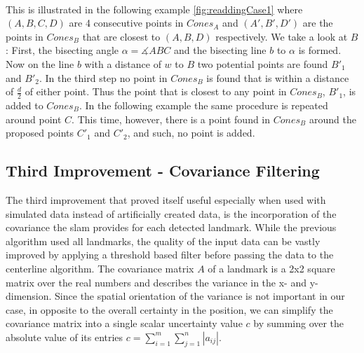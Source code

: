 \\This is illustrated in the following example \ref{fig:readdingCase1} where $(A,B,C,D)$ are 4 consecutive points in $Cones_A$ and $(A',B',D')$ are the points in $Cones_B$ that are closest to $(A,B,D)$ respectively.
We take a look at $B$: First, the bisecting angle $\alpha =\measuredangle  ABC$ and the bisecting line $b$ to $\alpha$ is formed. Now on the line $b$ with a distance of $w$ to $B$ two potential points are found $B'_1$ and $B'_2$. In the third step no point in $Cones_B$ is found that is within a distance of $\frac{d}{2}$ of either point. Thus the point that is closest to any point in $Cones_B$, $B'_1$, is added to $Cones_B$.
In the following example the same procedure is repeated around point $C$.
 This time, however, there is a point found in $Cones_B$ around the proposed points $C'_1$ and $C'_2$, and such, no point is added.
\subsection{Third Improvement - Covariance Filtering}
The third improvement that proved itself useful especially when used with simulated data instead of artificially created data, is the incorporation of the covariance the \ac{slam} provides for each detected landmark. While the previous algorithm used all landmarks, the quality of the input data can be vastly improved by applying a threshold based filter before passing the data to the centerline algorithm. The covariance matrix $A$ of a landmark is a 2x2 square matrix over the real numbers and describes the variance in the x- and y-dimension. Since the spatial orientation of the variance is not important in our case, in opposite to the overall certainty in the position, we can simplify the covariance matrix into a single scalar uncertainty value $c$ by summing over the absolute value of its entries $c = \sum_{i=1}^m \sum_{j=1}^n |a_{ij}|$.

